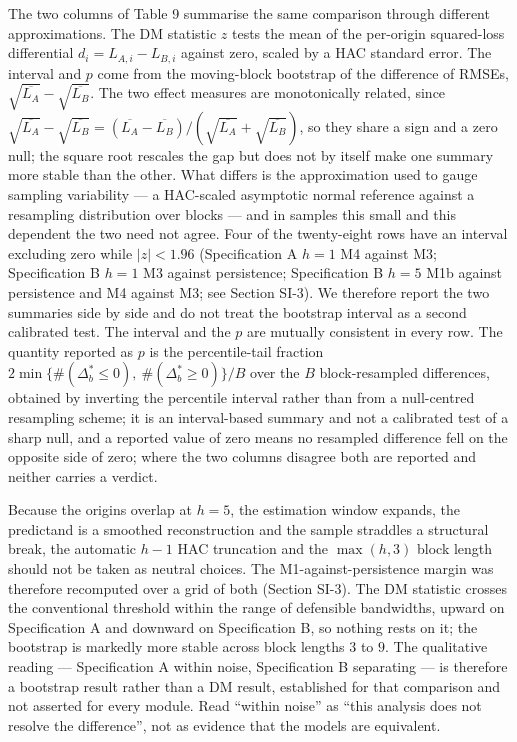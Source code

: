 \documentclass[11pt]{article}
\begin{document}
The two columns of Table 9 summarise the same comparison through
different approximations. The DM statistic \(z\) tests the mean of the
per-origin squared-loss differential \(d_i = L_{A,i} - L_{B,i}\) against
zero, scaled by a HAC standard error. The interval and \(p\) come from
the moving-block bootstrap of the difference of RMSEs,
\(\sqrt{\overline{L_A}} - \sqrt{\overline{L_B}}\). The two effect
measures are monotonically related, since
\(\sqrt{\overline{L_A}}-\sqrt{\overline{L_B}} =
(\overline{L_A}-\overline{L_B})/(\sqrt{\overline{L_A}}+
\sqrt{\overline{L_B}})\), so they share a sign and a zero null; the
square root rescales the gap but does not by itself make one summary
more stable than the other. What differs is the approximation used to
gauge sampling variability --- a HAC-scaled asymptotic normal reference
against a resampling distribution over blocks --- and in samples this
small and this dependent the two need not agree. Four of the
twenty-eight rows have an interval excluding zero while \(|z| < 1.96\)
(Specification A \(h=1\) M4 against M3; Specification B \(h=1\) M3
against persistence; Specification B \(h=5\) M1b against persistence and
M4 against M3; see Section SI-3). We therefore report the two
summaries side by side
and do not treat the bootstrap interval as a second calibrated test. The interval and the \(p\) are mutually
consistent in every row. The quantity reported as \(p\) is the percentile-tail fraction
\(2\min\{\#(\Delta^{*}_b\le 0),\ \#(\Delta^{*}_b\ge 0)\}/B\) over the
\(B\) block-resampled differences, obtained by inverting the percentile
interval rather than from a null-centred resampling scheme; it is an
interval-based summary and not a calibrated test of a sharp null, and a
reported value of zero means no resampled difference fell on the
opposite side of zero; where the two columns disagree both are
reported and neither carries a verdict.

Because the origins overlap at \(h=5\), the estimation window expands,
the predictand is a smoothed reconstruction and the sample straddles a
structural break, the automatic \(h-1\) HAC truncation and the
\(\max(h,3)\) block length should not be taken as neutral choices. The
M1-against-persistence margin was therefore recomputed over a grid of
both (Section SI-3). The DM statistic crosses the conventional
threshold within the range of defensible bandwidths, upward on
Specification A and downward on Specification B, so nothing rests on it;
the bootstrap is markedly more stable across block lengths \(3\) to
\(9\). The qualitative reading --- Specification A within noise,
Specification B separating --- is therefore a bootstrap result rather
than a DM result, established for that comparison and not asserted for
every module. Read
``within noise'' as ``this analysis does not resolve the difference'',
not as evidence that the models are equivalent.
\end{document}
